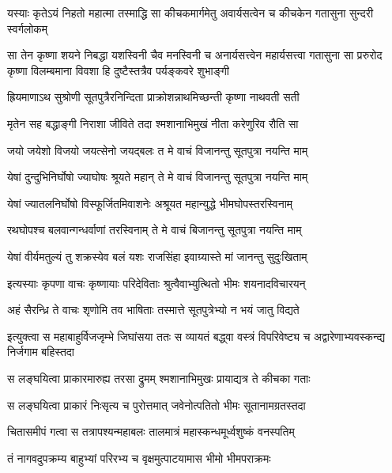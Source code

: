 \twolineshloka
{यस्याः कृतेऽयं निहतो महात्मा तस्माद्धि सा कीचकमार्गमेतु}
{अवार्यसत्वेन च कीचकेन गतासुना सुन्दरी स्वर्गलोकम्}


\threelineshloka
{सा तेन कृष्णा शयने निबद्धा यशस्विनी चैव मनस्विनी च}
{अनार्यसत्त्वेन महार्यसत्त्वा गतासुना सा प्ररुरोद कृष्णा}
{विलम्बमाना विवशा हि दुष्टैस्तत्रैव पर्यङ्कवरे शुभाङ्गी}


\twolineshloka
{ह्रियमाणाऽथ सुश्रोणी सूतपुत्रैरनिन्दिता}
{प्राक्रोशन्नाथमिच्छन्ती कृष्णा नाथवती सती}


\twolineshloka
{मृतेन सह बद्धाङ्गी निराशा जीविते तदा}
{श्मशानाभिमुखं नीता करेणुरिव रौति सा}




\twolineshloka
{जयो जयेशो विजयो जयत्सेनो जयद्बलः}
{त मे वाचं विजानन्तु सूतपुत्रा नयन्ति माम्}


\twolineshloka
{येषां दुन्दुभिनिर्घोषो ज्याघोषः श्रूयते महान्}
{ते मे वाचं विजानन्तु सूतपुत्रा नयन्ति माम्}


\twolineshloka
{येषां ज्यातलनिर्घोषो विस्फूर्जितमिवाशनेः}
{अश्रूयत महान्युद्धे भीमघोपस्तरस्विनाम्}


\twolineshloka
{रथघोपश्च बलवान्गन्धर्वाणां तरस्विनाम्}
{ते मे वाचं बिजानन्तु सूतपुत्रा नयन्ति माम्}


\twolineshloka
{येषां वीर्यमतुल्यं तु शक्रस्येव बलं यशः}
{राजसिंहा इवाग्र्यास्ते मां जानन्तु सुदुःखिताम्}


\twolineshloka
{इत्यस्याः कृपणा वाचः कृष्णायाः परिदेविताः}
{श्रुत्वैवाभ्युत्थितो भीमः शयनादविचारयन्}




\twolineshloka
{अहं सैरन्ध्रि ते वाचः शृणोमि तव भाषिताः}
{तस्मात्ते सूतपुत्रेभ्यो न भयं जातु विद्यते}



\onelineshloka
{इत्युक्त्वा स महाबाहुर्विजजृम्भे जिघांसया}
\twolineshloka
{ततः स व्यायतं बद्ध्वा वस्त्रं विपरिवेष्ट्य च}
{अद्वारेणाभ्यवस्कन्द्य निर्जगाम बहिस्तदा}


\twolineshloka
{स लङ्घयित्वा प्राकारमारुह्य तरसा द्रुमम्}
{श्मशानाभिमुखः प्रायाद्यत्र ते कीचका गताः}


\twolineshloka
{स लङ्घयित्वा प्राकारं निःसृत्य च पुरोत्तमात्}
{जवेनोत्पतितो भीमः सूतानामग्रतस्तदा}


\twolineshloka
{चितासमीपं गत्वा स तत्रापश्यन्महाबलः}
{तालमात्रं महास्कन्धमूर्ध्वशुष्कं वनस्पतिम्}


\twolineshloka
{तं नागवदुपक्रम्य बाहुभ्यां परिरभ्य च}
{वृक्षमुत्पाटयामास भीमो भीमपराक्रमः}


